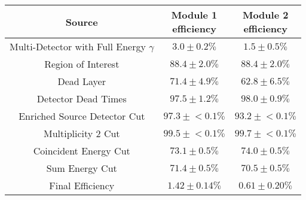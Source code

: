\begin{tabular}{|c|c|c|}
\hline
  Source & \makecell{Module 1\\efficiency} & \makecell{Module 2\\efficiency} \\
\hline
  \makecell{Multi-Detector with\\Full Energy $\gamma$} & $3.0 \pm 0.2\%$ & $1.5 \pm 0.5\%$ \\
  Region of Interest & $88.4 \pm 2.0\%$ & $88.4 \pm 2.0\%$ \\
  Dead Layer & $71.4 \pm 4.9\%$ & $62.8 \pm 6.5\%$ \\
  Detector Dead Times & $97.5 \pm 1.2\%$ & $98.0 \pm 0.9\%$ \\
  Enriched Source Detector Cut & $97.3 \pm{}<\!0.1\%$ & $93.2 \pm{}<\!0.1\%$ \\
  Multiplicity 2 Cut & $99.5 \pm{}<\!0.1\%$ & $99.7 \pm{}<\!0.1\%$ \\
  Coincident Energy Cut & $73.1 \pm 0.5\%$ & $74.0 \pm 0.5\%$ \\
  Sum Energy Cut & $71.4 \pm 0.5\%$ & $70.5 \pm 0.5\%$ \\
  \hline Final Efficiency & $1.42 \pm 0.14\%$ & $0.61 \pm 0.20\%$ \\
\hline
\end{tabular}
